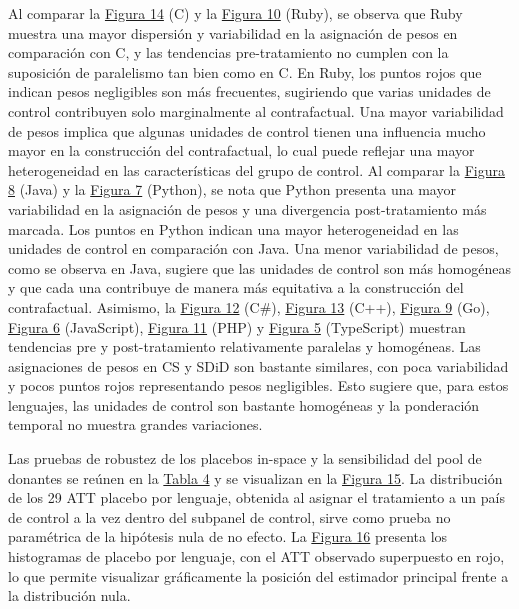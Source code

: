 \documentclass[12pt,a4paper]{article}
\begin{document}
Al comparar la \hyperref[fig:figura14]{Figura 14} (C) y la \hyperref[fig:figura10]{Figura 10} (Ruby), se observa que Ruby muestra una mayor dispersión y variabilidad en la asignación de pesos en comparación con C, y las tendencias pre-tratamiento no cumplen con la suposición de paralelismo tan bien como en C. En Ruby, los puntos rojos que indican pesos negligibles son más frecuentes, sugiriendo que varias unidades de control contribuyen solo marginalmente al contrafactual. Una mayor variabilidad de pesos implica que algunas unidades de control tienen una influencia mucho mayor en la construcción del contrafactual, lo cual puede reflejar una mayor heterogeneidad en las características del grupo de control. Al comparar la \hyperref[fig:figura8]{Figura 8} (Java) y la \hyperref[fig:figura7]{Figura 7} (Python), se nota que Python presenta una mayor variabilidad en la asignación de pesos y una divergencia post-tratamiento más marcada. Los puntos en Python indican una mayor heterogeneidad en las unidades de control en comparación con Java. Una menor variabilidad de pesos, como se observa en Java, sugiere que las unidades de control son más homogéneas y que cada una contribuye de manera más equitativa a la construcción del contrafactual. Asimismo, la \hyperref[fig:figura12]{Figura 12} (C\#), \hyperref[fig:figura13]{Figura 13} (C++), \hyperref[fig:figura9]{Figura 9} (Go), \hyperref[fig:figura6]{Figura 6} (JavaScript), \hyperref[fig:figura11]{Figura 11} (PHP) y \hyperref[fig:figura5]{Figura 5} (TypeScript) muestran tendencias pre y post-tratamiento relativamente paralelas y homogéneas. Las asignaciones de pesos en CS y SDiD son bastante similares, con poca variabilidad y pocos puntos rojos representando pesos negligibles. Esto sugiere que, para estos lenguajes, las unidades de control son bastante homogéneas y la ponderación temporal no muestra grandes variaciones.

Las pruebas de robustez de los placebos in-space y la sensibilidad del pool de donantes se reúnen en la \hyperref[tab:tabla6]{Tabla 4} y se visualizan en la \hyperref[fig:figura15]{Figura 15}. La distribución de los 29 ATT placebo por lenguaje, obtenida al asignar el tratamiento a un país de control a la vez dentro del subpanel de control, sirve como prueba no paramétrica de la hipótesis nula de no efecto. La \hyperref[fig:figura16]{Figura 16} presenta los histogramas de placebo por lenguaje, con el ATT observado superpuesto en rojo, lo que permite visualizar gráficamente la posición del estimador principal frente a la distribución nula.
\end{document}
